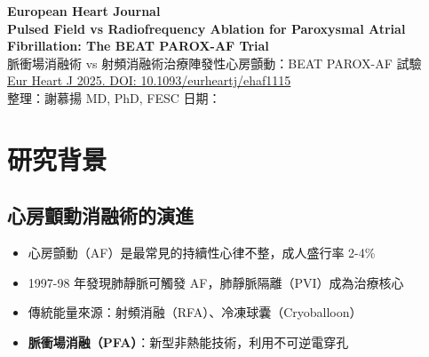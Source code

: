 \documentclass[12pt,a4paper]{article}
\begin{document}
\begin{center}
{\LARGE\bfseries\textcolor{emergency_red}{European Heart Journal}}\\[0.5cm]
{\Large\textbf{Pulsed Field vs Radiofrequency Ablation for Paroxysmal Atrial Fibrillation: The BEAT PAROX-AF Trial}}\\[0.3cm]
{\large 脈衝場消融術 vs 射頻消融術治療陣發性心房顫動：BEAT PAROX-AF 試驗}\\[0.5cm]
{\normalsize \href{https://doi.org/10.1093/eurheartj/ehaf1115}{Eur Heart J 2025. DOI: 10.1093/eurheartj/ehaf1115}}\\[0.3cm]
{\normalsize 整理：謝慕揚 MD, PhD, FESC \quad 日期：\mydate}
\end{center}

\vspace{0.5cm}


\section{研究背景}

\subsection{心房顫動消融術的演進}

\begin{itemize}
    \item 心房顫動（AF）是最常見的持續性心律不整，成人盛行率 2-4\%
    \item 1997-98 年發現肺靜脈可觸發 AF，肺靜脈隔離（PVI）成為治療核心
    \item 傳統能量來源：射頻消融（RFA）、冷凍球囊（Cryoballoon）
    \item \textbf{脈衝場消融（PFA）}：新型非熱能技術，利用不可逆電穿孔
\end{itemize}
\end{document}
